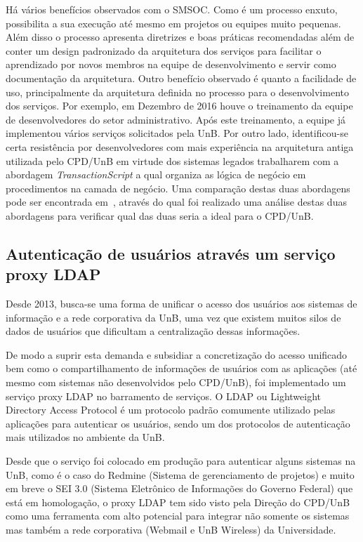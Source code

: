 \documentclass[12pt]{article}
\begin{document}
Há vários benefícios observados com o SMSOC.
Como é um processo enxuto, possibilita
a sua execução até mesmo em projetos ou equipes muito pequenas. Além disso
o processo apresenta diretrizes e boas práticas recomendadas além de conter
um design padronizado 
da arquitetura dos serviços para facilitar o aprendizado por novos membros na equipe
de desenvolvimento e servir como 
documentação da arquitetura. Outro benefício observado é quanto a facilidade 
de uso, principalmente da arquitetura definida no processo para o desenvolvimento dos serviços. 
Por exemplo, em Dezembro de 2016 houve o treinamento
da equipe de desenvolvedores do setor administrativo. Após este treinamento,
a equipe já implementou vários serviços solicitados pela UnB. 
Por outro lado, identificou-se certa resistência por desenvolvedores com 
mais experiência na arquitetura antiga utilizada pelo CPD/UnB 
em virtude dos sistemas legados trabalharem com 
a abordagem \textit{TransactionScript} 
a qual organiza as lógica de negócio em procedimentos na camada de negócio. 
Uma comparação
destas duas abordagens pode ser encontrada em~\cite{agilar2016},
através do qual foi realizado uma análise destas duas abordagens
para verificar qual das duas seria a ideal para o CPD/UnB.




\subsection{Autenticação de usuários através um serviço proxy LDAP}\label{ldap}

Desde 2013, busca-se uma forma de unificar o acesso dos usuários aos
sistemas de informação e a rede corporativa da UnB, 
uma vez que existem muitos
silos de dados de usuários que dificultam a centralização dessas informações. 

De modo a suprir esta demanda e subsidiar a concretização do acesso 
unificado bem como o compartilhamento de informações de usuários
com as aplicações (até mesmo com sistemas não desenvolvidos pelo CPD/UnB), 
foi implementado um serviço proxy LDAP no barramento de serviços.
O LDAP ou Lightweight Directory Access Protocol é um 
protocolo padrão comumente utilizado pelas aplicações para autenticar os usuários,
sendo um dos protocolos de autenticação mais utilizados no ambiente da UnB.

Desde que o serviço foi colocado em produção para 
autenticar alguns sistemas na UnB, como é o caso do Redmine (Sistema de gerenciamento de projetos) e 
muito em breve o SEI 3.0 (Sistema Eletrônico de Informações do Governo Federal) que está em homologação,
o proxy LDAP tem sido visto pela Direção do CPD/UnB como uma ferramenta
com alto potencial para integrar não somente os sistemas 
mas também a rede corporativa (Webmail e UnB Wireless) da Universidade.
\end{document}
